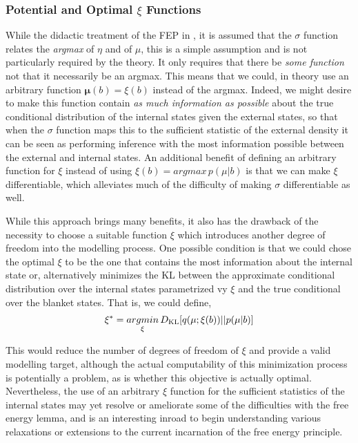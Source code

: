 \subsubsection{Potential and Optimal $\xi$ Functions}


While the didactic treatment of the FEP in \citep{friston2019particularphysics, parr2020Markov}, it is assumed that the $\sigma$ function relates the \emph{argmax} of $\eta$ and of $\mu$, this is a simple assumption and is not particularly required by the theory. It only requires that there be \emph{some function} not that it necessarily be an argmax. This means that we could, in theory use an arbitrary function $\bm{\mu}(b) = \xi(b)$ instead of the argmax. Indeed, we might desire to make this function contain \emph{as much information as possible} about the true conditional distribution of the internal states given the external states, so that when the $\sigma$ function maps this to the sufficient statistic of the external density it can be seen as performing inference with the most information possible between the external and internal states. An additional benefit of defining an arbitrary function for $\xi$ instead of using $\xi(b) = argmax \, p(\mu| b)$ is that we can make $\xi$ differentiable, which alleviates much of the difficulty of making $\sigma$ differentiable as well.

While this approach brings many benefits, it also has the drawback of the necessity to choose a suitable function $\xi$ which introduces another degree of freedom into the modelling process. One possible condition is that we could chose the optimal $\xi$ to be the one that contains the most information about the internal state or, alternatively minimizes the KL between the approximate conditional distribution over the internal states parametrized vy $\xi$ and the true conditional over the blanket states. That is, we could define,
\begin{align*}
  \xi^* = \underset{\xi}{argmin} \, D_\mathrm{KL}[q(\mu; \xi(b)) || p(\mu | b)]
\end{align*}

This would reduce the number of degrees of freedom of $\xi$ and provide a valid modelling target, although the actual computability of this minimization process is potentially a problem, as is whether this objective is actually optimal. Nevertheless, the use of an arbitrary $\xi$ function for the sufficient statistics of the internal states may yet resolve or ameliorate some of the difficulties with the free energy lemma, and is an interesting inroad to begin understanding various relaxations or extensions to the current incarnation of the free energy principle.

